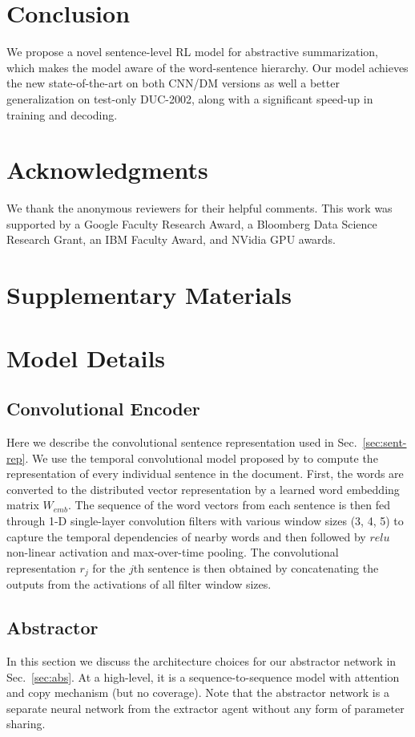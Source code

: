 \documentclass[11pt,a4paper]{article}
\def\secref#1{Sec.~\ref{#1}}
\begin{document}
 
\section{Conclusion}
We propose a novel sentence-level RL model for abstractive summarization, which makes the model aware of the word-sentence hierarchy.
Our model achieves the new state-of-the-art on both CNN/DM versions as well a better generalization on test-only DUC-2002, along with a significant speed-up in training and decoding.



\section*{Acknowledgments}
We thank the anonymous reviewers for their helpful comments. This work was supported by a
Google Faculty Research Award, a Bloomberg Data Science Research Grant, an IBM Faculty
Award, and NVidia GPU awards.




\clearpage
\appendix
\section*{Supplementary Materials}
\section{Model Details}
\subsection{Convolutional Encoder}
\label{sec:conv}
Here we describe the convolutional sentence representation used in \secref{sec:sent-rep}.
We use the temporal convolutional model proposed by 
\citet{kim:2014:EMNLP2014} to compute the representation of 
every individual sentence in the document. 
First, the words are converted to the distributed vector representation by a learned word embedding matrix $W_{emb}$. 
The sequence of the word vectors from each sentence is then fed through
1-D single-layer convolution filters with various window sizes (3, 4, 5) to capture the 
temporal dependencies of nearby words and then followed by $relu$ non-linear activation and max-over-time pooling. 
The convolutional representation $r_j$ for the $j$th sentence is then obtained by concatenating the outputs from the activations of all filter window sizes.


\subsection{Abstractor}
\label{sec:copy-summ}
In this section we discuss the architecture choices for our abstractor network in \secref{sec:abs}.
At a high-level, it is a sequence-to-sequence model with attention and copy mechanism (but no coverage).
Note that the abstractor network is a separate neural network from the extractor agent without any form of parameter sharing.
\end{document}
